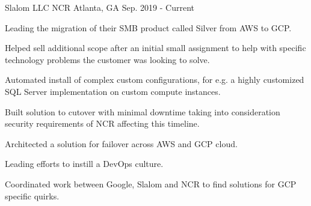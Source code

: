 

\begin{cventries}

\cventry
{Slalom LLC} %
{NCR} %
{Atlanta, GA} %
{Sep. 2019 - Current} %
{
  \begin{cvitems} %
    \item {Leading the migration of their SMB product called Silver from AWS to GCP.}
    \item {Helped sell additional scope after an initial small assignment to help with specific technology problems the customer was looking to solve.}
    \item {Automated install of complex custom configurations, for e.g. a highly customized SQL Server implementation on custom compute instances.}
    \item {Built solution to cutover with minimal downtime taking into consideration security requirements of NCR affecting this timeline.}
    \item {Architected a solution for failover across AWS and GCP cloud.}
    \item {Leading efforts to instill a DevOps culture.}
    \item {Coordinated work between Google, Slalom and NCR to find solutions for GCP specific quirks.}
  \end{cvitems}
}


\end{cventries}
